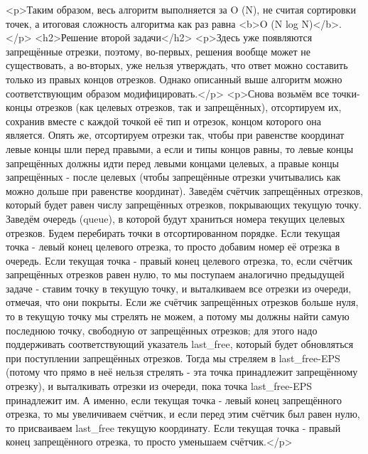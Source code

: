 <p>Таким образом, весь алгоритм выполняется за O (N), не считая сортировки точек, а итоговая сложность алгоритма как раз равна <b>O (N log N)</b>.</p>
<h2>Решение второй задачи</h2>
<p>Здесь уже появляются запрещённые отрезки, поэтому, во-первых, решения вообще может не существовать, а во-вторых, уже нельзя утверждать, что ответ можно составить только из правых концов отрезков. Однако описанный выше алгоритм можно соответствующим образом модифицировать.</p>
<p>Снова возьмём все точки-концы отрезков (как целевых отрезков, так и запрещённых), отсортируем их, сохранив вместе с каждой точкой её тип и отрезок, концом которого она является. Опять же, отсортируем отрезки так, чтобы при равенстве координат левые концы шли перед правыми, а если и типы концов равны, то левые концы запрещённых должны идти перед левыми концами целевых, а правые концы запрещённых - после целевых (чтобы запрещённые отрезки учитывались как можно дольше при равенстве координат). Заведём счётчик запрещённых отрезков, который будет равен числу запрещённых отрезков, покрывающих текущую точку. Заведём очередь (queue), в которой будут храниться номера текущих целевых отрезков. Будем перебирать точки в отсортированном порядке. Если текущая точка - левый конец целевого отрезка, то просто добавим номер её отрезка в очередь. Если текущая точка - правый конец целевого отрезка, то, если счётчик запрещённых отрезков равен нулю, то мы поступаем аналогично предыдущей задаче - ставим точку в текущую точку, и выталкиваем все отрезки из очереди, отмечая, что они покрыты. Если же счётчик запрещённых отрезков больше нуля, то в текущую точку мы стрелять не можем, а потому мы должны найти самую последнюю точку, свободную от запрещённых отрезков; для этого надо поддерживать соответствующий указатель last_free, который будет обновляться при поступлении запрещённых отрезков. Тогда мы стреляем в last_free-EPS (потому что прямо в неё нельзя стрелять - эта точка принадлежит запрещённому отрезку), и выталкивать отрезки из очереди, пока точка last_free-EPS принадлежит им. А именно, если текущая точка - левый конец запрещённого отрезка, то мы увеличиваем счётчик, и если перед этим счётчик был равен нулю, то присваиваем last_free текущую координату. Если текущая точка - правый конец запрещённого отрезка, то просто уменьшаем счётчик.</p>